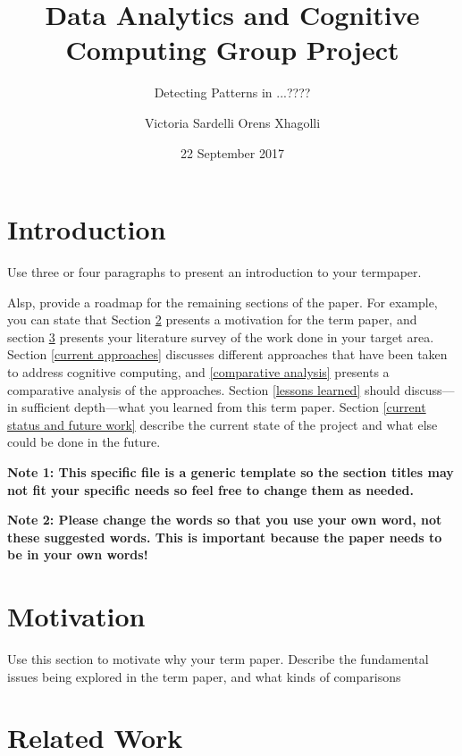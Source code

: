 \documentclass{sig-alternate}
\begin{document}
\title{Data Analytics and Cognitive Computing Group Project}
\subtitle{Detecting Patterns in ...????}
\author{
\alignauthor
Victoria Sardelli
\alignauthor
Orens Xhagolli
}
\date{22 September 2017}
\maketitle
\begin{abstract}
  
\end{abstract}

\section{Introduction}
\label{introduction}

Use three or four paragraphs to present an introduction to your termpaper.

Alsp, provide a roadmap for the remaining sections of the paper. For
example, you can state that Section \ref{motivation} presents a
motivation for the term paper, and section \ref{related work} presents your
literature survey of the work done in your target area. Section
\ref{current approaches} discusses different approaches that have been
taken to address cognitive computing, and \ref{comparative analysis}
presents a comparative analysis of the approaches. Section
\ref{lessons learned} should discuss---in sufficient depth---what you
learned from this term paper.  Section \ref{current status and future
  work} describe the current state of the project and what else
could be done in the future.

{\bf Note 1: This specific file is a generic template so the
  section titles may not fit your specific needs so feel
  free to change them as needed.}

{\bf Note 2: Please change the words so that you use your own word,
  not these suggested words. This is important because the paper needs
  to be in your own words!}

\section{Motivation}
\label{motivation}

Use this section to motivate why your term paper. Describe the
fundamental issues being explored in the term paper, and what kinds of
comparisons

\section{Related Work}
\label{related work}
\end{document}
